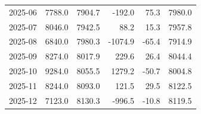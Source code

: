 \begin{longtable}{lrrrrr}
2025-06 & 7788.0 & 7904.7 & -192.0 & 75.3 & 7980.0 \\ 
2025-07 & 8046.0 & 7942.5 & 88.2 & 15.3 & 7957.8 \\ 
2025-08 & 6840.0 & 7980.3 & -1074.9 & -65.4 & 7914.9 \\ 
2025-09 & 8274.0 & 8017.9 & 229.6 & 26.4 & 8044.4 \\ 
2025-10 & 9284.0 & 8055.5 & 1279.2 & -50.7 & 8004.8 \\ 
2025-11 & 8244.0 & 8093.0 & 121.5 & 29.5 & 8122.5 \\ 
2025-12 & 7123.0 & 8130.3 & -996.5 & -10.8 & 8119.5 \\ 
\end{longtable}
\endgroup
